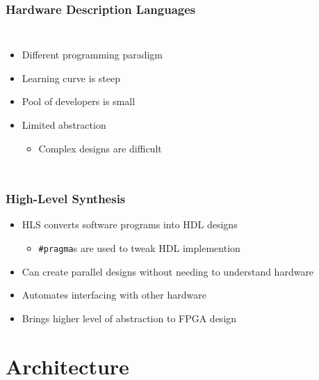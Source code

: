 \documentclass{beamer}
\begin{document}
\begin{frame}
	\frametitle{Hardware Description Languages}
	\begin{columns}
		\begin{itemize}
			\item Different programming paradigm
			\item Learning curve is steep
			\item Pool of developers is small
			\item Limited abstraction
			\begin{itemize}
				\item Complex designs are difficult
			\end{itemize}
		\end{itemize}
		
		
	\end{columns}
\end{frame}


\begin{frame}
	\frametitle{High-Level Synthesis}
	\begin{itemize}
		\item HLS converts software programs into HDL designs
		\begin{itemize}
			\item \texttt{\#pragma}s are used to tweak HDL implemention
		\end{itemize}
		\item Can create parallel designs without needing to understand hardware
		\item Automates interfacing with other hardware
		\item Brings higher level of abstraction to FPGA design
	\end{itemize}

	
\end{frame}


\section{Architecture}
\end{document}
